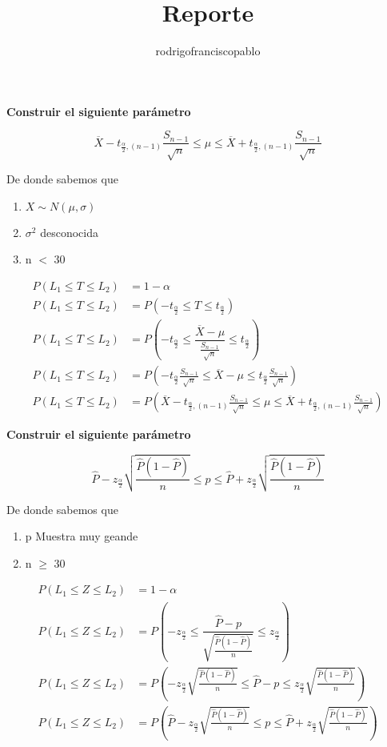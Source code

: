 \documentclass{mylib/reporte}
\title{Reporte}
\author{rodrigofranciscopablo }
\begin{document}
\coverPage

\textbf{Construir el siguiente parámetro}

$$\overline{X} - t_{\frac{\alpha}{2},(n-1)}\frac{S_{n-1}}{\sqrt{n}} \leq \mu \leq \overline{X} + t_{\frac{\alpha}{2},(n-1)}\frac{S_{n-1}}{\sqrt{n}}$$

De donde sabemos que
\begin{enumerate}
  \item  $X \sim N(\mu, \sigma)$
  \item $\sigma^2$ desconocida
  \item n $<$ 30
\end{enumerate}
\begin{align*}
  P(L_1 \leq T \leq L_2 ) &= 1 - \alpha \\
  P(L_1 \leq T \leq L_2 ) & = P(-t_{\frac{\alpha}{2}} \leq T \leq t_{\frac{\alpha}{2}} ) \\
  P(L_1 \leq T \leq L_2 ) &= P(-t_{\frac{\alpha}{2}} \leq \dfrac{\overline{X}-\mu}{\frac{S_{n-1}}{\sqrt{n}}} \leq t_{\frac{\alpha}{2}} )\\
  P(L_1 \leq T \leq L_2 ) &= P(-t_{\frac{\alpha}{2}}\frac{S_{n-1}}{\sqrt{n}} \leq \overline{X}-\mu \leq t_{\frac{\alpha}{2}} \frac{S_{n-1}}{\sqrt{n}} )\\
  P(L_1 \leq T \leq L_2 ) &= P(\overline{X} - t_{\frac{\alpha}{2},(n-1)}\frac{S_{n-1}}{\sqrt{n}} \leq \mu \leq \overline{X} + t_{\frac{\alpha}{2},(n-1)}\frac{S_{n-1}}{\sqrt{n}})
\end{align*}


\textbf{Construir el siguiente parámetro}

$$\hat{P} - z_{\frac{\alpha}{2}} \sqrt{\frac{\hat{P}(1-\hat{P})}{n}} \leq p \leq \hat{P} + z_{\frac{\alpha}{2}} \sqrt{\frac{\hat{P}(1-\hat{P})}{n}}$$

De donde sabemos que
\begin{enumerate}
  \item  p Muestra muy geande
  \item n $\geq$ 30
\end{enumerate}
\begin{align*}
  P(L_1 \leq Z \leq L_2 ) &= 1 - \alpha \\
  P(L_1 \leq Z \leq L_2 ) &= P(-z_{\frac{\alpha}{2}} \leq \dfrac{\hat{P}-p}{\sqrt{\frac{\hat{P}(1-\hat{P})}{n}}} \leq z_{\frac{\alpha}{2}})\\
  P(L_1 \leq Z \leq L_2 ) &= P\left(-z_{\frac{\alpha}{2}}\sqrt{\frac{\hat{P}(1-\hat{P})}{n}} \leq \hat{P}-p \leq z_{\frac{\alpha}{2}}\sqrt{\frac{\hat{P}(1-\hat{P})}{n}}\right)\\
  P(L_1 \leq Z \leq L_2 ) &= P\left(\hat{P} - z_{\frac{\alpha}{2}} \sqrt{\frac{\hat{P}(1-\hat{P})}{n}} \leq p \leq \hat{P} + z_{\frac{\alpha}{2}} \sqrt{\frac{\hat{P}(1-\hat{P})}{n}}\right)\\
\end{align*}
\end{document}

